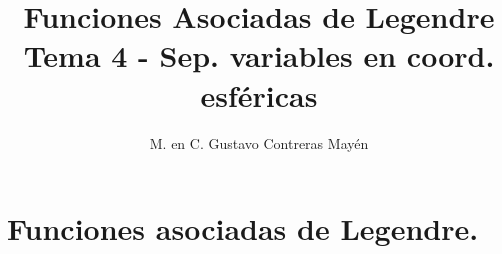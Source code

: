
\usepackage{apacite}
\title{Funciones Asociadas de Legendre \\ \large {Tema 4 - Sep. variables en coord. esféricas} \vspace{-3ex}}
\author{M. en C. Gustavo Contreras Mayén}
\date{ }

\vspace{-4cm}
\maketitle
\fontsize{14}{14}\selectfont
\tableofcontents
\newpage
\section{Funciones asociadas de Legendre.}

